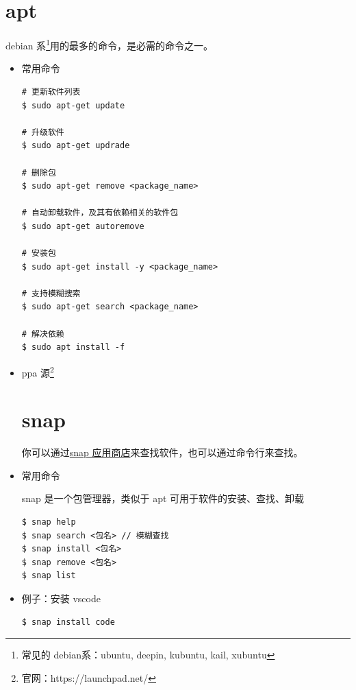 \section{apt}
debian 系\footnote{常见的 debian系：ubuntu, deepin, kubuntu, kail, xubuntu}用的最多的命令，是必需的命令之一。
\begin{itemize}
\item 常用命令
\begin{lstlisting}
# 更新软件列表
$ sudo apt-get update 

# 升级软件
$ sudo apt-get updrade 

# 删除包
$ sudo apt-get remove <package_name>

# 自动卸载软件，及其有依赖相关的软件包
$ sudo apt-get autoremove 

# 安装包
$ sudo apt-get install -y <package_name>

# 支持模糊搜索  
$ sudo apt-get search <package_name> 

# 解决依赖
$ sudo apt install -f
\end{lstlisting}


\item ppa 源\footnote{官网：https://launchpad.net/}
\newpage
	
\section{snap}
你可以通过\href{https://snapcraft.io/}{snap 应用商店}来查找软件，也可以通过命令行来查找。

\item 常用命令

snap 是一个包管理器，类似于 apt 可用于软件的安装、查找、卸载
\begin{lstlisting}
$ snap help 
$ snap search <包名> // 模糊查找
$ snap install <包名>
$ snap remove <包名>
$ snap list 
\end{lstlisting}

\item 例子：安装 vscode 
\begin{lstlisting}
$ snap install code
\end{lstlisting}
\end{itemize}

